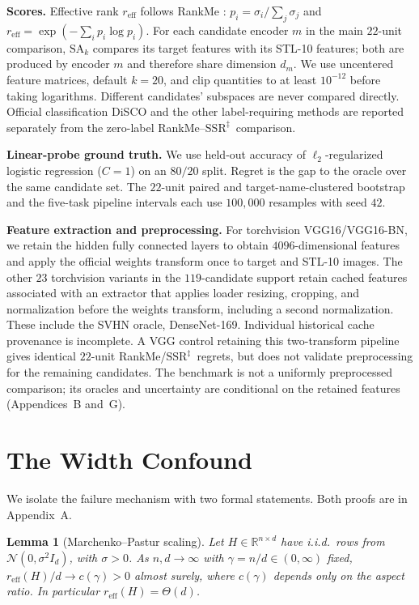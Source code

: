 \documentclass{article}
\newcommand{\reff}{\ensuremath{r_{\mathrm{eff}}}\xspace}
\newcommand{\SAk}{\ensuremath{\mathrm{SA}_k}\xspace}
\newcommand{\SSRdag}{\ensuremath{\mathrm{SSR}^{\ddagger}}\xspace}
\newtheorem{lemma}{Lemma}
\begin{document}
\textbf{Scores.} Effective rank $\reff$ follows RankMe \citep{garrido2023rankme}: $p_i=\sigma_i/\sum_j\sigma_j$ and $\reff=\exp(-\sum_i p_i\log p_i)$. For each candidate encoder $m$ in the main $22$-unit comparison, $\SAk$ compares its target features with its STL-10 features; both are produced by encoder $m$ and therefore share dimension $d_m$. We use uncentered feature matrices, default $k=20$, and clip quantities to at least $10^{-12}$ before taking logarithms. Different candidates' subspaces are never compared directly. Official classification DiSCO and the other label-requiring methods are reported separately from the zero-label RankMe--\SSRdag\ comparison.

\textbf{Linear-probe ground truth.} We use held-out accuracy of $\ell_2$-regularized logistic regression ($C=1$) on an $80/20$ split. Regret is the gap to the oracle over the same candidate set. The $22$-unit paired and target-name-clustered bootstrap and the five-task pipeline intervals each use $100{,}000$ resamples with seed $42$.

\textbf{Feature extraction and preprocessing.} For torchvision VGG16/VGG16-BN, we retain the hidden fully connected layers to obtain $4096$-dimensional features and apply the official weights transform once to target and STL-10 images. The other $23$ torchvision variants in the $119$-candidate support retain cached features associated with an extractor that applies loader resizing, cropping, and normalization before the weights transform, including a second normalization. These include the SVHN oracle, DenseNet-169. Individual historical cache provenance is incomplete. A VGG control retaining this two-transform pipeline gives identical $22$-unit RankMe/\SSRdag\ regrets, but does not validate preprocessing for the remaining candidates. The benchmark is not a uniformly preprocessed comparison; its oracles and uncertainty are conditional on the retained features (Appendices~B and~G).

\section{The Width Confound}
\label{sec:theory}

We isolate the failure mechanism with two formal statements. Both proofs are in Appendix~A.

\begin{lemma}[Marchenko--Pastur scaling]
\label{lem:mp}
Let $H \in \mathbb{R}^{n\times d}$ have i.i.d.\ rows from $\mathcal{N}(0,\sigma^2 I_d)$, with $\sigma>0$. As $n,d\to\infty$ with $\gamma = n/d\in(0,\infty)$ fixed,
$\reff(H)/d \to c(\gamma) > 0$ almost surely, where $c(\gamma)$ depends only on the aspect ratio.  In particular $\reff(H) = \Theta(d)$.
\end{lemma}
\end{document}
